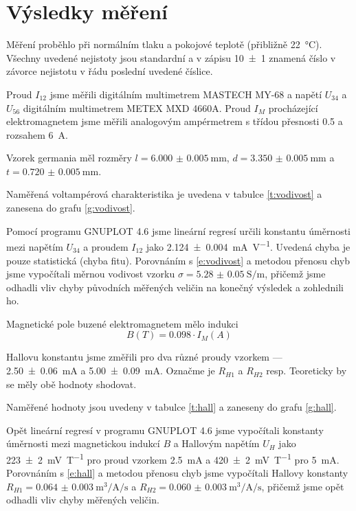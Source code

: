 \section*{Výsledky měření}
Měření proběhlo při normálním tlaku a pokojové teplotě (přibližně \SI{22}{\degreeCelsius}).
Všechny uvedené nejistoty jsou standardní a v zápisu \num{10(1)} znamená číslo v závorce nejistotu v řádu poslední uvedené číslice.


Proud $I_{12}$ jsme měřili digitálním multimetrem MASTECH MY-68 a napětí $U_{34}$ a $U_{56}$ digitálním multimetrem METEX MXD 4660A.
Proud $I_M$ procházející elektromagnetem jsme měřili analogovým ampérmetrem s třídou přesnosti \num{0.5} a rozsahem \SI{6}{\ampere}.

Vzorek germania měl rozměry $l=\SI{6.000(5)}{\mm}$, $d=\SI{3.350(5)}{\mm}$ a $t=\SI{0.720(5)}{\mm}$.


Naměřená voltampérová charakteristika je uvedena v tabulce \ref{t:vodivost} a zanesena do grafu \ref{g:vodivost}.

Pomocí programu GNUPLOT 4.6 jsme lineární regresí určili konstantu úměrnosti mezi napětím $U_{34}$ a proudem $I_{12}$ jako \SI{2.124(4)}{\milli\ampere\per\volt}.
Uvedená chyba je pouze statistická (chyba fitu).
Porovnáním s \eqref{e:vodivost} a metodou přenosu chyb jsme vypočítali měrnou vodivost vzorku $\sigma = \SI{5.28(5)}{\siemens\per\meter}$, přičemž jsme odhadli vliv chyby původních měřených veličin na konečný výsledek a zohlednili ho. 



Magnetické pole buzené elektromagnetem mělo indukci
\begin{equation}
B(T)=\num{0.098} \cdot I_M(A)
\end{equation}

Hallovu konstantu jsme změřili pro dva různé proudy vzorkem --- \SI{2.50(6)}{\milli\ampere} a \SI{5.00(9)}{\milli\ampere}. Označme je $R_{H1}$ a $R_{H2}$ resp. Teoreticky by se měly obě hodnoty shodovat.

Naměřené hodnoty jsou uvedeny v tabulce \ref{t:hall} a zaneseny do grafu \ref{g:hall}.

Opět lineární regresí v programu GNUPLOT 4.6 jsme vypočítali konstanty úměrnosti mezi magnetickou indukcí $B$ a Hallovým napětím $U_H$ jako \SI{223(2)}{\milli\volt\per\tesla} pro proud vzorkem \SI{2.5}{\milli\ampere} a \SI{420(2)}{\milli\volt\per\tesla} pro \SI{5}{\milli\ampere}.
Porovnáním s \eqref{e:hall} a metodou přenosu chyb jsme vypočítali Hallovy konstanty $R_{H1}=\SI{0.064(3)}{\metre\cubed\per\ampere\per\second}$ a $R_{H2}=\SI{0.060(3)}{\metre\cubed\per\ampere\per\second}$, přičemž jsme opět odhadli vliv chyby měřených veličin.


